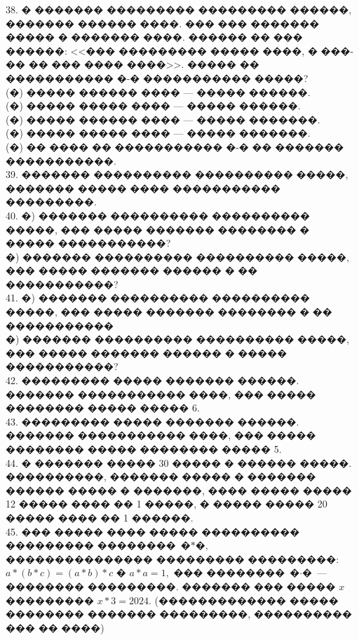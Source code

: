 \documentclass[12pt]{article}
\begin{document}
38. � ������� ��������� ��������� ������, ������� ������ ����. ��� ��� ������� ����� � ������� ����. ������ �� ��� ������: <<��� ��������� ����� ����, � ���-�� �� ��� ���� ����>>. ����� �� ����������� �-� ����������� �����?\\
(�) ����� ������ ���� --- ����� ������.\\
(�) ����� ����� ���� --- ����� ������.\\
(�) ����� ������ ���� --- ����� �������.\\
(�) ����� ����� ���� --- ����� �������.\\
(�) �� ���� �� ����������� �-� �� ������� �����������.\\
39. ������� ���������� ���������� �����, ������� ����� ���� ����������� ���������.\\
40. �) ������� ���������� ���������� �����, ��� ����� ������� �������� � ����� �����������?\\
�) ������� ���������� ���������� �����, ��� ����� ������� ������ � �� �����������?\\
41. �) ������� ���������� ���������� �����, ��� ����� ������� �������� � �� �����������\\
�) ������� ���������� ���������� �����, ��� ����� ������� ������ � ����� �����������?\\
42. ��������� ����� ������� ������. ������� ����������� ����, ��� ����� �������� ����� ����� 6.\\
43. ��������� ����� ������� ������. ������� ����������� ����, ��� ����� �������� ����� �������� ����� 5.\\
44. � ������� ����� 30 ����� � ������ �����. ����������, ������� ����� � ������� ������ ����� � �������, ���� ����� ����� 12 ����� ���� �� 1 �����, � ����� ����� 20 ����� ���� �� 1 ������.\\
45. ��� ����� ���� ����� ���������� ��������� �������� $\text{�$\ast$�,}$ ��������������� ��������� ���������:
$a*(b*c)=(a*b)*c$ � $a*a=1,$ ��� �������� $\text{�$\cdot$�}$ --- �������� ���������. ������� ��� ����� $x$ ���������
$x*3=2024.$ (������������� ����� �������� ������� ���������, ���������� ��� �� ����)
\newpage
\end{document}
